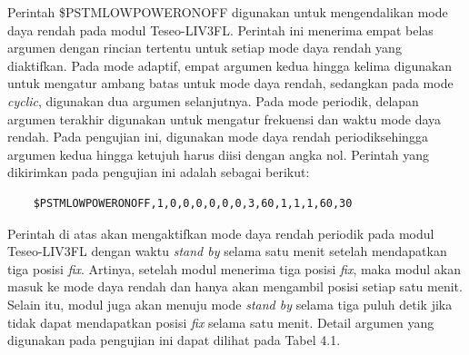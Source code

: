 Perintah \$PSTMLOWPOWERONOFF digunakan untuk mengendalikan mode daya rendah pada modul Teseo-LIV3FL. Perintah ini menerima empat belas argumen dengan rincian tertentu untuk setiap mode daya rendah yang diaktifkan. Pada mode adaptif, empat argumen kedua hingga kelima digunakan untuk mengatur ambang batas untuk mode daya rendah, sedangkan pada mode \textit{cyclic}, digunakan dua argumen selanjutnya. Pada mode periodik, delapan argumen terakhir digunakan untuk mengatur frekuensi dan waktu mode daya rendah. Pada pengujian ini, digunakan mode daya rendah periodiksehingga argumen kedua hingga ketujuh harus diisi dengan angka nol. Perintah yang dikirimkan pada pengujian ini adalah sebagai berikut:

\begin{verbatim}
	$PSTMLOWPOWERONOFF,1,0,0,0,0,0,0,3,60,1,1,1,60,30
\end{verbatim}

Perintah di atas akan mengaktifkan mode daya rendah periodik pada modul Teseo-LIV3FL dengan waktu \textit{stand by} selama satu menit setelah mendapatkan tiga posisi \textit{fix}. Artinya, setelah modul menerima tiga posisi \textit{fix}, maka modul akan masuk ke mode daya rendah dan hanya akan mengambil posisi setiap satu menit. Selain itu, modul juga akan menuju mode \textit{stand by} selama tiga puluh detik jika tidak dapat mendapatkan posisi \textit{fix} selama satu menit. Detail argumen yang digunakan pada pengujian ini dapat dilihat pada Tabel 4.1.

